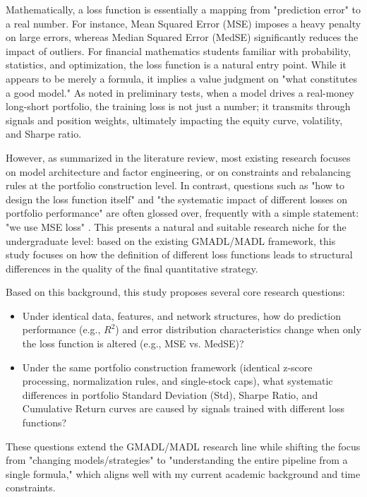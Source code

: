 \documentclass[openany]{book}
\numberwithin{figure}{chapter}
\numberwithin{equation}{chapter}
\begin{document}
Mathematically, a loss function is essentially a mapping from "prediction error" to a real number. For instance, Mean Squared Error (MSE) imposes a heavy penalty on large errors, whereas Median Squared Error (MedSE) significantly reduces the impact of outliers. For financial mathematics students familiar with probability, statistics, and optimization, the loss function is a natural entry point. While it appears to be merely a formula, it implies a value judgment on "what constitutes a good model." As noted in preliminary tests, when a model drives a real-money long-short portfolio, the training loss is not just a number; it transmits through signals and position weights, ultimately impacting the equity curve, volatility, and Sharpe ratio.

However, as summarized in the literature review, most existing research focuses on model architecture and factor engineering, or on constraints and rebalancing rules at the portfolio construction level. In contrast, questions such as "how to design the loss function itself" and "the systematic impact of different losses on portfolio performance" are often glossed over, frequently with a simple statement: "we use MSE loss" \cite{di2016artificial, yang2019deep}. This presents a natural and suitable research niche for the undergraduate level: based on the existing GMADL/MADL framework, this study focuses on how the definition of different loss functions leads to structural differences in the quality of the final quantitative strategy.

Based on this background, this study proposes several core research questions:
\begin{itemize}
    \item Under identical data, features, and network structures, how do prediction performance (e.g., $R^2$) and error distribution characteristics change when only the loss function is altered (e.g., MSE vs. MedSE)?
    \item Under the same portfolio construction framework (identical z-score processing, normalization rules, and single-stock caps), what systematic differences in portfolio Standard Deviation (Std), Sharpe Ratio, and Cumulative Return curves are caused by signals trained with different loss functions?
\end{itemize}

These questions extend the GMADL/MADL research line while shifting the focus from "changing models/strategies" to "understanding the entire pipeline from a single formula," which aligns well with my current academic background and time constraints.
\end{document}
